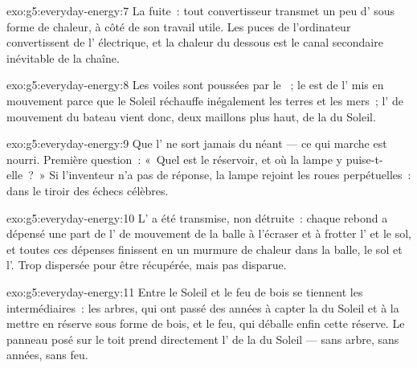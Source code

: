 \begin{solution}{exo:g5:everyday-energy:7}
La fuite~: tout convertisseur transmet un peu d' sous forme de
chaleur, à côté de son travail utile. Les puces de l'ordinateur
convertissent de l' électrique, et la chaleur du dessous est
le canal secondaire inévitable de la chaîne.
\end{solution}

\begin{solution}{exo:g5:everyday-energy:8}
Les voiles sont poussées par le ~; le  est de l' mis en
mouvement parce que le Soleil réchauffe inégalement les terres et les
mers~; l' de mouvement du bateau vient donc, deux maillons
plus haut, de la  du Soleil.
\end{solution}

\begin{solution}{exo:g5:everyday-energy:9}
Que l' ne sort jamais du néant --- ce qui marche est nourri.
Première question~: «~Quel est le réservoir, et où la lampe y
puise-t-elle~?~» Si l'inventeur n'a pas de réponse, la lampe rejoint
les roues perpétuelles~: dans le tiroir des échecs célèbres.
\end{solution}

\begin{solution}{exo:g5:everyday-energy:10}
L' a été transmise, non détruite~: chaque rebond a dépensé une
part de l' de mouvement de la balle à l'écraser et à frotter
l' et le sol, et toutes ces dépenses finissent en un murmure de
chaleur dans la balle, le sol et l'. Trop dispersée pour être
récupérée, mais pas disparue.
\end{solution}

\begin{solution}{exo:g5:everyday-energy:11}
Entre le Soleil et le feu de bois se tiennent les intermédiaires~:
les arbres, qui ont passé des années à capter la  du Soleil et
à la mettre en réserve sous forme de bois, et le feu, qui déballe
enfin cette réserve. Le panneau posé sur le toit prend directement
l' de la  du Soleil --- sans arbre, sans années, sans
feu.
\end{solution}
